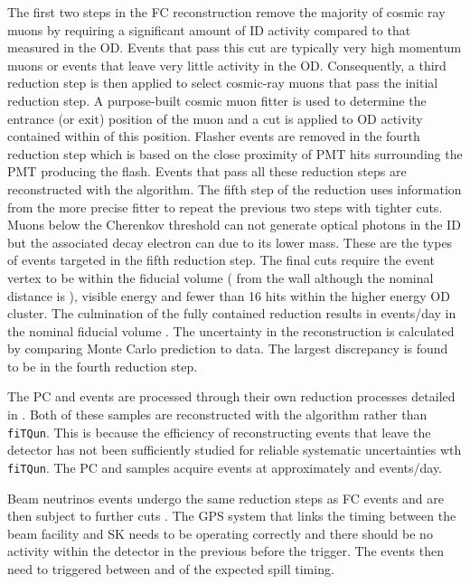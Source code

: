 The first two steps in the FC reconstruction remove the majority of cosmic ray muons by requiring a significant amount of ID activity compared to that measured in the OD. Events that pass this cut are typically very high momentum muons or events that leave very little activity in the OD. Consequently, a third reduction step is then applied to select cosmic-ray muons that pass the initial reduction step. A purpose-built cosmic muon fitter is used to determine the entrance (or exit) position of the muon and a cut is applied to OD activity contained within  of this position. Flasher events are removed in the fourth reduction step which is based on the close proximity of PMT hits surrounding the PMT producing the flash. Events that pass all these reduction steps are reconstructed with the \apfit algorithm. The fifth step of the reduction uses information from the more precise fitter to repeat the previous two steps with tighter cuts. Muons below the Cherenkov threshold can not generate optical photons in the ID but the associated decay electron can due to its lower mass. These are the types of events targeted in the fifth reduction step. The final cuts require the event vertex to be within the fiducial volume ( from the wall although the nominal distance is ), visible energy  and fewer than 16 hits within the higher energy OD cluster. The culmination of the fully contained reduction results in  events/day in the nominal fiducial volume \cite{thesis_miao}. The uncertainty in the reconstruction is calculated by comparing Monte Carlo prediction to data. The largest discrepancy is found to be  in the fourth reduction step.

The PC and  events are processed through their own reduction processes detailed in \cite{Ashie_2005}. Both of these samples are reconstructed with the \apfit algorithm rather than \texttt{fiTQun}. This is because the efficiency of reconstructing events that leave the detector has not been sufficiently studied for reliable systematic uncertainties wth \texttt{fiTQun}. The PC and  samples acquire events at approximately  and  events/day.

Beam neutrinos events undergo the same reduction steps as FC events and are then subject to further cuts \cite{t2k_tn_027}. The GPS system that links the timing between the beam facility and SK needs to be operating correctly and there should be no activity within the detector in the previous  before the trigger. The events then need to triggered between  and  of the expected spill timing.

